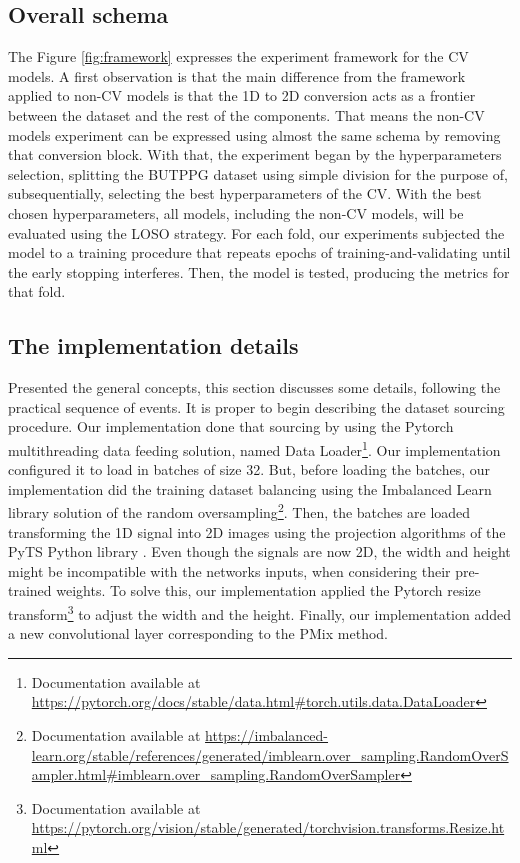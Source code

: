 \subsection{Overall schema}



The Figure \ref{fig:framework} expresses the experiment framework for the \gls{CV} models. A first observation is that the main difference from the framework applied to non-\gls{CV} models is that the 1D to 2D conversion acts as a frontier between the dataset and the rest of the components. That means the non-\gls{CV} models experiment can be expressed using almost the same schema by removing that conversion block. With that, the experiment began by the hyperparameters selection, splitting the \gls{BUTPPG} dataset using simple division for the purpose of, subsequentially, selecting the best hyperparameters of the \gls{CV}. With the best chosen hyperparameters, all models, including the non-\gls{CV} models, will be evaluated using the \gls{LOSO} strategy. For each fold, our experiments subjected the model to a training procedure that repeats epochs of training-and-validating until the early stopping interferes. Then, the model is tested, producing the metrics for that fold.

\subsection{The implementation details}

Presented the general concepts, this section discusses some details, following the practical sequence of events. It is proper to begin describing the dataset sourcing procedure. Our implementation done that sourcing by using the Pytorch multithreading data feeding solution, named Data Loader\footnote{Documentation available at \url{https://pytorch.org/docs/stable/data.html\#torch.utils.data.DataLoader}}. Our implementation configured it to load in batches of size 32. But, before loading the batches, our implementation did the training dataset balancing using the Imbalanced Learn library \cite{ImbalancedLearn} solution of the random oversampling\footnote{Documentation available at \url{https://imbalanced-learn.org/stable/references/generated/imblearn.over_sampling.RandomOverSampler.html\#imblearn.over_sampling.RandomOverSampler}}. Then, the batches are loaded transforming the 1D signal into 2D images using the projection algorithms of the PyTS Python library \cite{PyTS}. Even though the signals are now 2D, the width and height might be incompatible with the networks inputs, when considering their pre-trained weights. To solve this, our implementation applied the Pytorch resize transform\footnote{Documentation available at \url{https://pytorch.org/vision/stable/generated/torchvision.transforms.Resize.html}} to adjust the width and the height. Finally, our implementation added a new convolutional layer corresponding to the \gls{PMix} method.

